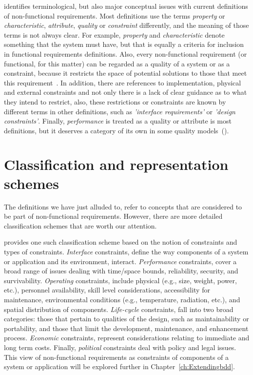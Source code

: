\documentclass[dissertation,final]{softeng}
\begin{document}
\citet{Glinz:2007ehba} identifies terminological, but also major conceptual issues with current definitions of non-functional requirements. Most definitions use the terms \emph{property} or \emph{characteristic}, \emph{attribute}, \emph{quality} or \emph{constraint} differently, and the meaning of those terms is not always clear. For example, \emph{property} and \emph{characteristic} denote something that the system must have, but that is equally a criteria for inclusion in functional requirements definitions. Also, every non-functional requirement (or functional, for this matter) can be regarded as a quality of a system or as a constraint, because it restricts the space of potential solutions to those that meet this requirement~\citep{Glinz:2007ehba}. In addition, there are references to implementation, physical and external constraints and not only there is a lack of clear guidance as to what they intend to restrict, also, these restrictions or constraints are known by different terms in other definitions, such as \emph{'interface requirements'} or \emph{'design constraints'}. Finally, \emph{performance} is treated as a quality or attribute is most definitions, but it deserves a category of its own in some quality models~().

\section{Classification and representation schemes}

The definitions we have just alluded to, refer to concepts that are considered to be part of non-functional requirements. However, there are more detailed classification schemes that are worth our attention.

\citet{Roman:1985} provides one such classification scheme based on the notion of constraints and types of constraints. \emph{Interface} constraints, define the way components of a system or application and its environment, interact. \emph{Performance} constraints, cover a broad range of issues dealing with time/space bounds, reliability, security, and survivability. \emph{Operating} constraints, include physical (e.g., size, weight, power, etc.), personnel availability, skill level considerations, accessibility for maintenance, environmental conditions (e.g., temperature, radiation, etc.), and spatial distribution of components. \emph{Life-cycle} constraints, fall into two broad categories: those that pertain to qualities of the design, such as maintainability or portability, and those that limit the development, maintenance, and enhancement process. \emph{Economic} constraints, represent considerations relating to immediate and long term costs. Finally, \emph{political} constraints deal with policy and legal issues. This view of non-functional requirements as constraints of components of a system or application will be explored further in Chapter~\ref{ch:Extendingbdd}.
\end{document}
